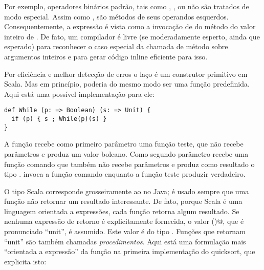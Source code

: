 Por exemplo, operadores bin\'{a}rios padr\~{a}o, tais como \code{+}, \code{-},
ou \code{<} n\~{a}o s\~{a}o tratados de modo especial. Assim como , 
s\~{a}o m\'{e}todos de seus operandos esquerdos. Consequentemente, a express\~{a}o 
 \'{e} vista como a invoca\c{c}\~{a}o de  do m\'{e}todo \code{+}      
do valor inteiro de . De fato, um compilador \'{e} livre (se 
moderadamente esperto, ainda que  esperado) para reconhecer o caso 
especial da chamada de m\'{e}todo \code{+} sobre argumentos inteiros e 
para gerar c\'{o}digo inline eficiente para isso.  

Por efici\^{e}ncia e melhor detec\c{c}\~{a}o de erros o la\c{c}o  \'{e} um construtor 
primitivo em Scala. Mas em princ\'{i}pio, poderia do mesmo modo ser uma fun\c{c}\~{a}o 
predefinida. Aqui est\'{a} uma poss\'{i}vel implementa\c{c}\~{a}o para ele: 
\begin{lstlisting}
def While (p: => Boolean) (s: => Unit) {
  if (p) { s ; While(p)(s) }
}
\end{lstlisting}


A fun\c{c}\~{a}o  recebe como primeiro par\^{a}metro uma fun\c{c}\~{a}o teste,
que n\~{a}o recebe par\^{a}metros e produz um valor boleano. Como segundo par\^{a}metro 
recebe uma fun\c{c}\~{a}o comando que tamb\'{e}m n\~{a}o recebe par\^{a}metros e produz como 
resultado o tipo  \lstinline@Unit@.  invoca a fun\c{c}\~{a}o comando
enquanto a fun\c{c}\~{a}o teste produzir verdadeiro.

O tipo Scala \lstinline@Unit@ corresponde grosseiramente ao \lstinline@void@
no Java; \'{e} usado sempre que uma fun\c{c}\~{a}o n\~{a}o retornar um resultado interessante.
De fato, porque Scala \'{e} uma linguagem orientada a express\~{o}es, cada fun\c{c}\~{a}o 
retorna algum resultado. Se nenhuma express\~{a}o de retorno \'{e}  explicitamente
fornecida, o valor \lstinline@()@, que \'{e} pronunciado ``unit'', \'{e} assumido.
Este valor \'{e} do tipo \lstinline@Unit@. Fun\c{c}\~{o}es que retornam ``unit'' s\~{a}o 
tamb\'{e}m chamadas {\em procedimentos}. Aqui est\'{a} uma formula\c{c}\~{a}o mais 
``orientada a express\~{a}o'' da fun\c{c}\~{a}o \lstinline@swap@ na primeira implementa\c{c}\~{a}o
do quicksort, que explicita isto:

